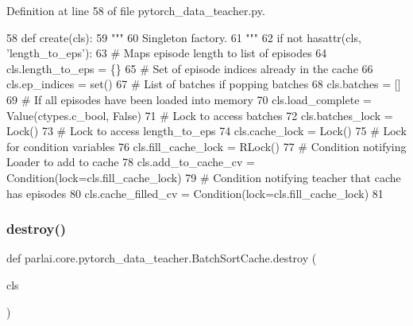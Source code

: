 Definition at line 58 of file pytorch\+\_\+data\+\_\+teacher.\+py.


\begin{DoxyCode}
58     \textcolor{keyword}{def }create(cls):
59         \textcolor{stringliteral}{"""}
60 \textcolor{stringliteral}{        Singleton factory.}
61 \textcolor{stringliteral}{        """}
62         \textcolor{keywordflow}{if} \textcolor{keywordflow}{not} hasattr(cls, \textcolor{stringliteral}{'length\_to\_eps'}):
63             \textcolor{comment}{# Maps episode length to list of episodes}
64             cls.length\_to\_eps = \{\}
65             \textcolor{comment}{# Set of episode indices already in the cache}
66             cls.ep\_indices = set()
67             \textcolor{comment}{# List of batches if popping batches}
68             cls.batches = []
69             \textcolor{comment}{# If all episodes have been loaded into memory}
70             cls.load\_complete = Value(ctypes.c\_bool, \textcolor{keyword}{False})
71             \textcolor{comment}{# Lock to access batches}
72             cls.batches\_lock = Lock()
73             \textcolor{comment}{# Lock to access length\_to\_eps}
74             cls.cache\_lock = Lock()
75             \textcolor{comment}{# Lock for condition variables}
76             cls.fill\_cache\_lock = RLock()
77             \textcolor{comment}{# Condition notifying Loader to add to cache}
78             cls.add\_to\_cache\_cv = Condition(lock=cls.fill\_cache\_lock)
79             \textcolor{comment}{# Condition notifying teacher that cache has episodes}
80             cls.cache\_filled\_cv = Condition(lock=cls.fill\_cache\_lock)
81 
\end{DoxyCode}
\mbox{\label{classparlai_1_1core_1_1pytorch__data__teacher_1_1BatchSortCache_a115f5df4f4fafa087f592e9a0ab48d9c}} 
\subsubsection{\texorpdfstring{destroy()}{destroy()}}
{\footnotesize\ttfamily def parlai.\+core.\+pytorch\+\_\+data\+\_\+teacher.\+Batch\+Sort\+Cache.\+destroy (\begin{DoxyParamCaption}\item[{}]{cls }\end{DoxyParamCaption})}

